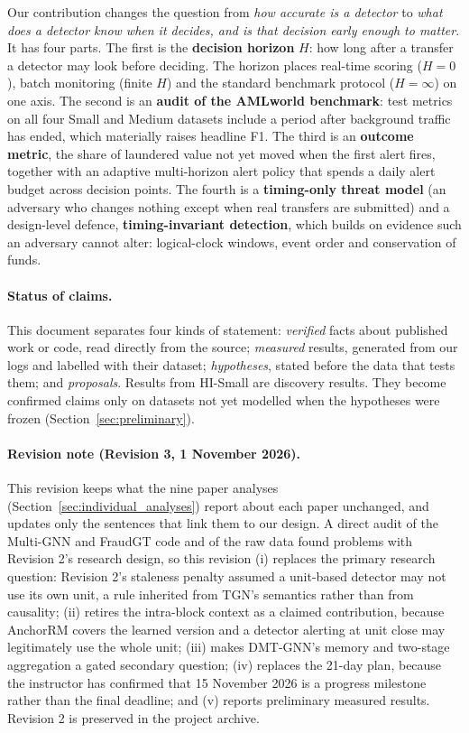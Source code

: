 \documentclass[11pt,a4paper]{article}
\begin{document}
Our contribution changes the question from \emph{how accurate is a detector} to \emph{what does a detector know when it decides, and is that decision early enough to matter}. It has four parts. The first is the \textbf{decision horizon} $H$: how long after a transfer a detector may look before deciding. The horizon places real-time scoring ($H=0$), batch monitoring (finite $H$) and the standard benchmark protocol ($H=\infty$) on one axis. The second is an \textbf{audit of the AMLworld benchmark}: test metrics on all four Small and Medium datasets include a period after background traffic has ended, which materially raises headline F1. The third is an \textbf{outcome metric}, the share of laundered value not yet moved when the first alert fires, together with an adaptive multi-horizon alert policy that spends a daily alert budget across decision points. The fourth is a \textbf{timing-only threat model} (an adversary who changes nothing except when real transfers are submitted) and a design-level defence, \textbf{timing-invariant detection}, which builds on evidence such an adversary cannot alter: logical-clock windows, event order and conservation of funds.

\paragraph{Status of claims.} This document separates four kinds of statement: \emph{verified} facts about published work or code, read directly from the source; \emph{measured} results, generated from our logs and labelled with their dataset; \emph{hypotheses}, stated before the data that tests them; and \emph{proposals}. Results from HI-Small are discovery results. They become confirmed claims only on datasets not yet modelled when the hypotheses were frozen (Section~\ref{sec:preliminary}).

\paragraph{Revision note (Revision 3, 1 November 2026).} This revision keeps what the nine paper analyses (Section~\ref{sec:individual_analyses}) report about each paper unchanged, and updates only the sentences that link them to our design. A direct audit of the Multi-GNN and FraudGT code and of the raw data found problems with Revision 2's research design, so this revision (i) replaces the primary research question: Revision 2's staleness penalty assumed a unit-based detector may not use its own unit, a rule inherited from TGN's semantics rather than from causality; (ii) retires the intra-block context as a claimed contribution, because AnchorRM covers the learned version and a detector alerting at unit close may legitimately use the whole unit; (iii) makes DMT-GNN's memory and two-stage aggregation a gated secondary question; (iv) replaces the 21-day plan, because the instructor has confirmed that 15 November 2026 is a progress milestone rather than the final deadline; and (v) reports preliminary measured results. Revision 2 is preserved in the project archive.
\end{document}
